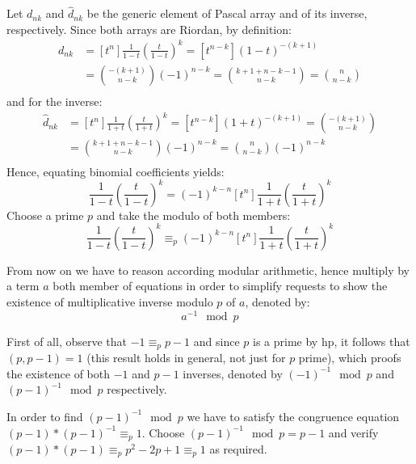 \documentclass[10pt,a4paper]{article} %
\begin{document}
    Let $d_{nk}$ and $\hat{d}_{nk}$ be the generic element of Pascal
    array and of its inverse, respectively. Since both arrays are
    Riordan, by definition:
    \begin{displaymath}
        \begin{split}
            d_{nk} &= [t^n]\frac{1}{1-t}\left(\frac{t}{1-t}\right)^k = [t^{n-k}](1-t)^{-(k+1)} \\
                &= {{-(k+1)} \choose {n-k}}(-1)^{n-k} = {{k+1 +n-k -1} \choose {n-k}} = {{n} \choose {n-k}} \\
        \end{split}
    \end{displaymath}
    and for the inverse:
    \begin{displaymath}
        \begin{split}
            \hat{d}_{nk} &= [t^n]\frac{1}{1+t}\left(\frac{t}{1+t}\right)^k = [t^{n-k}](1+t)^{-(k+1)} = 
                {{-(k+1)} \choose {n-k}} \\
                &= {{k+1 +n-k -1} \choose {n-k}} (-1)^{n-k} = {{n} \choose {n-k}} (-1)^{n-k}\\
        \end{split}
    \end{displaymath}
    Hence, equating binomial coefficients yields:
    \begin{displaymath}
        [t^n]\frac{1}{1-t}\left(\frac{t}{1-t}\right)^k = (-1)^{k-n}[t^n]\frac{1}{1+t}\left(\frac{t}{1+t}\right)^k 
    \end{displaymath}
    Choose a prime $p$ and take the modulo of both members:
    \begin{displaymath}
        [t^n]\frac{1}{1-t}\left(\frac{t}{1-t}\right)^k \equiv_{p} (-1)^{k-n}[t^n]\frac{1}{1+t}\left(\frac{t}{1+t}\right)^k 
    \end{displaymath}

    From now on we have to reason according modular arithmetic, hence
    multiply by a term $a$ both member of equations in order to
    simplify requests to show the existence of multiplicative inverse
    modulo $p$ of $a$, denoted by: $$a^{-1}\mod p$$

    First of all, observe that $-1 \equiv_{p} p-1$ and since $p$ is a
    prime by hp, it follows that $(p, p-1)=1$ (this result holds in
    general, not just for $p$ prime), which proofs the existence of
    both $-1$ and $p-1$ inverses, denoted by $(-1)^{-1}\mod p$ and
    $(p-1)^{-1}\mod p$ respectively.

    In order to find $(p-1)^{-1}\mod p$ we have to satisfy the
    congruence equation $(p-1) * (p-1)^{-1} \equiv_{p} 1$. Choose
    $(p-1)^{-1}\mod p = p-1$ and verify
    $(p-1) * (p-1) \equiv_{p} p^2 -2p +1 \equiv_{p} 1$ as required.
\end{document}
